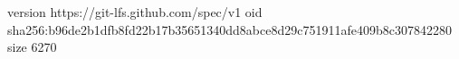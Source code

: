 version https://git-lfs.github.com/spec/v1
oid sha256:b96de2b1dfb8fd22b17b35651340dd8abce8d29c751911afe409b8c307842280
size 6270
